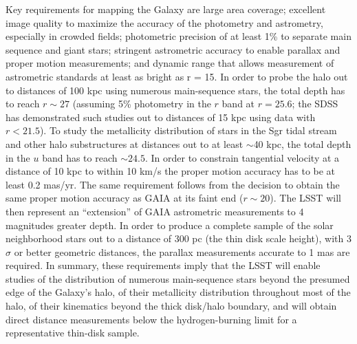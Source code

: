 Key requirements for mapping the Galaxy are large area coverage; excellent
image quality to maximize the accuracy of the photometry and astrometry,
especially in crowded fields; photometric precision of at least 1\% to
separate main sequence and giant stars; stringent astrometric accuracy to
enable parallax and proper motion measurements; and dynamic range that
allows measurement of astrometric standards at least as bright as r =
15. In order to probe the halo out to distances of 100 kpc using numerous
main-sequence stars, the total depth has to reach $r\sim27$ (assuming 5\%
photometry in the $r$ band at $r=25.6$; the SDSS has demonstrated such
studies out to distances of 15 kpc using data with $r<21.5$). To study the
metallicity distribution of stars in the Sgr tidal stream and other halo
substructures at distances out to at least $\sim$40 kpc, the total depth in
the $u$ band has to reach $\sim24.5$.  In order to constrain tangential
velocity at a distance of 10 kpc to within 10 km/s the proper motion
accuracy has to be at least 0.2 mas/yr. The same requirement follows from
the decision to obtain the same proper motion accuracy as GAIA at its faint
end ($r\sim20$). The LSST will then represent an ``extension'' of GAIA
astrometric measurements to 4 magnitudes greater depth. In order to produce
a complete sample of the solar neighborhood stars out to a distance of 300
pc (the thin disk scale height), with 3$\sigma$ or better geometric
distances, the parallax measurements accurate to 1 mas are required. In
summary, these requirements imply that the LSST will enable studies of the
distribution of numerous main-sequence stars beyond the presumed edge of
the Galaxy's halo, of their metallicity distribution throughout most of the
halo, of their kinematics beyond the thick disk/halo boundary, and will
obtain direct distance measurements below the hydrogen-burning limit for a
representative thin-disk sample.





